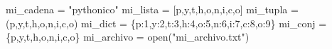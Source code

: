 \documentclass[
  letterpaper,
  DIV=11,
  numbers=noendperiod]{scrreprt}
\newenvironment{Shaded}{\begin{snugshade}}{\end{snugshade}}
\newcommand{\BuiltInTok}[1]{\textcolor[rgb]{0.00,0.23,0.31}{#1}}
\newcommand{\DecValTok}[1]{\textcolor[rgb]{0.68,0.00,0.00}{#1}}
\newcommand{\NormalTok}[1]{\textcolor[rgb]{0.00,0.23,0.31}{#1}}
\newcommand{\OperatorTok}[1]{\textcolor[rgb]{0.37,0.37,0.37}{#1}}
\newcommand{\StringTok}[1]{\textcolor[rgb]{0.13,0.47,0.30}{#1}}
\begin{document}
\begin{Shaded}
\begin{Highlighting}[]
\NormalTok{mi\_cadena }\OperatorTok{=} \StringTok{"pythonico"}
\NormalTok{mi\_lista }\OperatorTok{=}\NormalTok{ [}\StringTok{\textquotesingle{}p\textquotesingle{}}\NormalTok{,}\StringTok{\textquotesingle{}y\textquotesingle{}}\NormalTok{,}\StringTok{\textquotesingle{}t\textquotesingle{}}\NormalTok{,}\StringTok{\textquotesingle{}h\textquotesingle{}}\NormalTok{,}\StringTok{\textquotesingle{}o\textquotesingle{}}\NormalTok{,}\StringTok{\textquotesingle{}n\textquotesingle{}}\NormalTok{,}\StringTok{\textquotesingle{}i\textquotesingle{}}\NormalTok{,}\StringTok{\textquotesingle{}c\textquotesingle{}}\NormalTok{,}\StringTok{\textquotesingle{}o\textquotesingle{}}\NormalTok{]}
\NormalTok{mi\_tupla }\OperatorTok{=}\NormalTok{ (}\StringTok{\textquotesingle{}p\textquotesingle{}}\NormalTok{,}\StringTok{\textquotesingle{}y\textquotesingle{}}\NormalTok{,}\StringTok{\textquotesingle{}t\textquotesingle{}}\NormalTok{,}\StringTok{\textquotesingle{}h\textquotesingle{}}\NormalTok{,}\StringTok{\textquotesingle{}o\textquotesingle{}}\NormalTok{,}\StringTok{\textquotesingle{}n\textquotesingle{}}\NormalTok{,}\StringTok{\textquotesingle{}i\textquotesingle{}}\NormalTok{,}\StringTok{\textquotesingle{}c\textquotesingle{}}\NormalTok{,}\StringTok{\textquotesingle{}o\textquotesingle{}}\NormalTok{)}
\NormalTok{mi\_dict }\OperatorTok{=}\NormalTok{ \{}\StringTok{\textquotesingle{}p\textquotesingle{}}\NormalTok{:}\DecValTok{1}\NormalTok{,}\StringTok{\textquotesingle{}y\textquotesingle{}}\NormalTok{:}\DecValTok{2}\NormalTok{,}\StringTok{\textquotesingle{}t\textquotesingle{}}\NormalTok{:}\DecValTok{3}\NormalTok{,}\StringTok{\textquotesingle{}h\textquotesingle{}}\NormalTok{:}\DecValTok{4}\NormalTok{,}\StringTok{\textquotesingle{}o\textquotesingle{}}\NormalTok{:}\DecValTok{5}\NormalTok{,}\StringTok{\textquotesingle{}n\textquotesingle{}}\NormalTok{:}\DecValTok{6}\NormalTok{,}\StringTok{\textquotesingle{}i\textquotesingle{}}\NormalTok{:}\DecValTok{7}\NormalTok{,}\StringTok{\textquotesingle{}c\textquotesingle{}}\NormalTok{:}\DecValTok{8}\NormalTok{,}\StringTok{\textquotesingle{}o\textquotesingle{}}\NormalTok{:}\DecValTok{9}\NormalTok{\}}
\NormalTok{mi\_conj }\OperatorTok{=}\NormalTok{ \{}\StringTok{\textquotesingle{}p\textquotesingle{}}\NormalTok{,}\StringTok{\textquotesingle{}y\textquotesingle{}}\NormalTok{,}\StringTok{\textquotesingle{}t\textquotesingle{}}\NormalTok{,}\StringTok{\textquotesingle{}h\textquotesingle{}}\NormalTok{,}\StringTok{\textquotesingle{}o\textquotesingle{}}\NormalTok{,}\StringTok{\textquotesingle{}n\textquotesingle{}}\NormalTok{,}\StringTok{\textquotesingle{}i\textquotesingle{}}\NormalTok{,}\StringTok{\textquotesingle{}c\textquotesingle{}}\NormalTok{,}\StringTok{\textquotesingle{}o\textquotesingle{}}\NormalTok{\}}
\NormalTok{mi\_archivo }\OperatorTok{=} \BuiltInTok{open}\NormalTok{(}\StringTok{"mi\_archivo.txt"}\NormalTok{)}


\end{Highlighting}
\end{Shaded}
\end{document}
